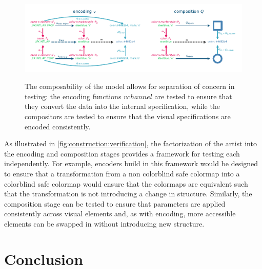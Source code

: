 \documentclass[preprint]{vgtc}
\begin{document}
\begin{figure}[!h]
  \includegraphics[width=\columnwidth, alt={The data value JFK INTL AP is paired with different variables (pressure and temperature) to verify that JFK is consistently encoded as the same color while pressure and temperature are encoded as different marker styles. The markerstyles and colors are then tested to ensure that the compositor builds a square and a circle that are the same color.}]{nu_qu.pdf}
  \caption{The composability of the model allows for separation of concern in testing: the encoding functions $vchannel$ are tested to ensure that they convert the data into the internal specification, while the compositors are tested to ensure that the visual specifications are encoded consistently.}\label{fig:construction:verification}
\end{figure}
As illustrated in \autoref{fig:construction:verification}, the factorization of the artist into the encoding and composition stages provides a framework for testing each independently. For example, encoders build in this framework would be designed to ensure that a transformation from a non colorblind safe colormap into a colorblind safe colormap would ensure that the colormaps are equivalent such that the transformation is not introducing a change in structure. Similarly, the composition stage can be tested to ensure that parameters are applied consistently across visual elements and, as with encoding, more accessible elements can be swapped in without introducing new structure.


\section{Conclusion}
\end{document}
